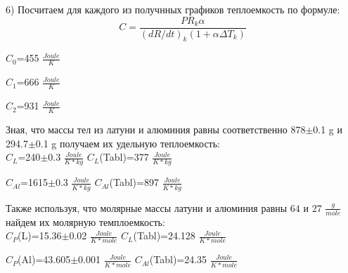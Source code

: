 \documentclass[a4paper,12pt]{article} %
\begin{document}
6) Посчитаем для каждого из получнных графиков  теплоемкость по формуле: $$C=\frac{PR_k\alpha}{(dR/dt)_k(1+\alpha\Delta T_k)}$$

$C_0$=455 $\frac{Joule}{K}$

$C_1$=666 $\frac{Joule}{K}$

$C_2$=931 $\frac{Joule}{K}$

Зная, что массы тел из латуни и алюминия равны соответственно 878$\pm$0.1 g и  294.7$\pm$0.1 g  получаем их удельную теплоемкость: \\

$C_L$=240$\pm$0.3 $\frac{Joule}{K*kg}$ \hspace{40pt} $C_L$(Tabl)=377 $\frac{Joule}{K*kg}$

$C_{Al}$=1615$\pm$0.3 $\frac{Joule}{K*kg}$ \hspace{31pt} $C_{Al}$(Tabl)=897 $\frac{Joule}{K*kg}$

Также используя, что молярные массы латуни и алюминия равны $64$ и $27$ $\frac{g}{mole}$ найдем их молярную темплоемкость:\\

$C_P$(L)=15.36$\pm$0.02 $\frac{Joule}{K*mole}$ \hspace{40pt} $C_L$(Tabl)=24.128 $\frac{Joule}{K*mole}$

$C_{P}$(Al)=43.605$\pm$0.001 $\frac{Joule}{K*mole}$ \hspace{31pt} $C_{Al}$(Tabl)=24.35 $\frac{Joule}{K*mole}$
\end{document}
